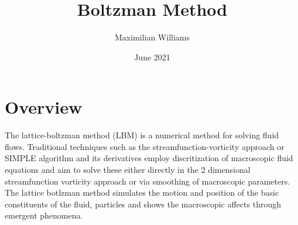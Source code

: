 \documentclass{article}
\title{Boltzman Method}
\author{Maximilian Williams}
\date{June 2021}
\begin{document}
\maketitle

\section*{Overview}
The lattice-boltzman method (LBM) is a numerical method for solving fluid flows. Traditional techniques such as the streamfunction-vorticity approach or SIMPLE algorithm and its derivatives employ discritization of macroscopic fluid equations and aim to solve these either directly in the 2 dimensional streamfunction vorticity approach or via smoothing of macroscopic parameters. The lattice botlzman method simulates the motion and position of the basic constituents of the fluid, particles and shows the macroscopic affects through emergent phenomena.
\end{document}
